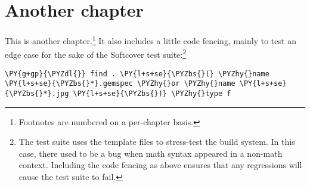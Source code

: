 \chapter{Another chapter}

This is another chapter.\footnote{Footnotes are numbered on a per-chapter basis.} It also includes a little code fencing, mainly to test an edge case for the sake of the Softcover test suite:\footnote{The test suite uses the template files to stress-test the build system. In this case, there used to be a bug when math syntax appeared in a non-math context. Including the code fencing as above ensures that any regressions will cause the test suite to fail.}

\begin{framed_shaded}
\begin{Verbatim}[fontsize=\relsize{-2.5},fontseries=b,commandchars=\\\{\}]
\PY{g+gp}{\PYZdl{}} find . \PY{l+s+se}{\PYZbs{}(} \PYZhy{}name \PY{l+s+se}{\PYZbs{}*}.gemspec \PYZhy{}or \PYZhy{}name \PY{l+s+se}{\PYZbs{}*}.jpg \PY{l+s+se}{\PYZbs{})} \PYZhy{}type f
\end{Verbatim}
\end{framed_shaded}